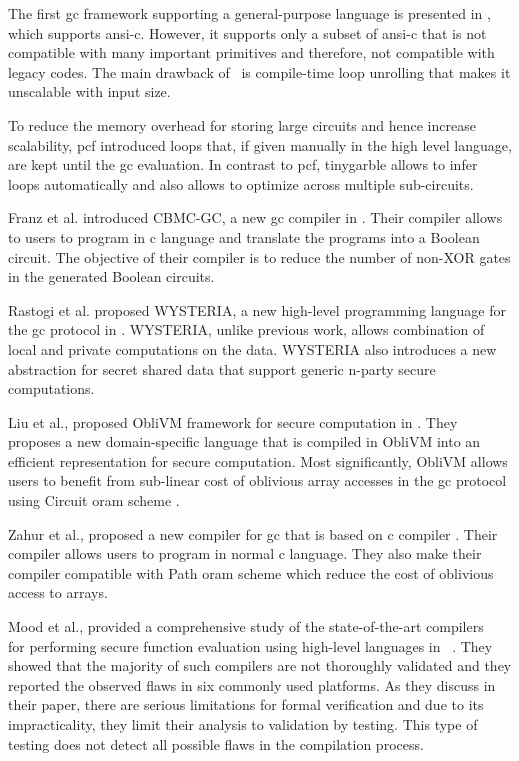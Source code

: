 The first \acrshort{gc} framework supporting a general-purpose language is presented in \cite{holzer2012secure}, which supports \acrshort{ansi}-\gls{c}.
However, it supports only a subset of \acrshort{ansi}-\gls{c} that is not compatible with many important primitives and therefore, not compatible with legacy codes.
The main drawback of~\cite{holzer2012secure} is compile-time loop unrolling that makes it unscalable with input size.

To reduce the memory overhead for storing large circuits and hence increase scalability, \gls{pcf} \cite{kreuter2013pcf} introduced loops that, if given manually in the high level language, are kept until the \acrshort{gc} evaluation.
In contrast to \gls{pcf}, \gls{tinygarble} allows to infer loops automatically and also allows to optimize across multiple sub-circuits.

Franz et al. introduced CBMC-GC, a new \acrshort{gc} compiler in \cite{franz2014cbmc}.
Their compiler allows to users to program in \gls{c} language and translate the programs into a Boolean circuit.
The objective of their compiler is to reduce the number of non-XOR gates in the generated Boolean circuits.

Rastogi et al. proposed WYSTERIA, a new high-level programming language for the \acrshort{gc} protocol in \cite{rastogi2014wysteria}.
WYSTERIA, unlike previous work, allows combination of local and private computations on the data.
WYSTERIA also introduces a new abstraction for secret shared data that support generic n-party secure computations.

Liu et al., proposed ObliVM framework for secure computation in \cite{liu2015oblivm}.
They proposes a new domain-specific language that is compiled in ObliVM into an efficient representation for secure computation.
Most significantly, ObliVM allows users to benefit from sub-linear cost of oblivious array accesses in the \acrshort{gc} protocol using Circuit \acrfull{oram} scheme \cite{wang2015circuit}.

Zahur et al., proposed a new compiler for \acrshort{gc} that is based on \gls{c} compiler \cite{zahur2015obliv}.
Their compiler allows users to program in normal \gls{c} language.
They also make their compiler compatible with Path \acrshort{oram} scheme \cite{stefanov2013path} which reduce the cost of oblivious access to arrays.

Mood et al., provided a comprehensive study of the state-of-the-art compilers~\cite{mood2012memory,kreuter2012billion,kreuter2013pcf, franz2014cbmc,zahur2015obliv,liu2015oblivm} for performing secure function evaluation using high-level languages in~\cite{mood2016frigate} .
They showed that the majority of such compilers are not thoroughly validated and they reported the observed flaws in six commonly used platforms.
As they discuss in their paper, there are serious limitations for formal verification and due to its impracticality, they limit their analysis to validation by testing.
This type of testing does not detect all possible flaws in the compilation process.

